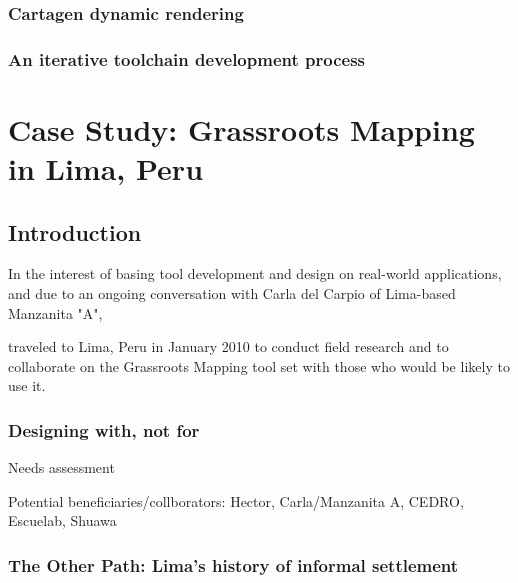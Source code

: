 \documentclass[11pt]{report}
\begin{document}
\subsection{Cartagen dynamic rendering}
\subsection{An iterative toolchain development process}

\chapter{Case Study: Grassroots Mapping in Lima, Peru}

\section{Introduction}

In the interest of basing tool development and design on real-world applications, and due to an ongoing conversation with Carla del Carpio of Lima-based Manzanita "A", 

traveled to Lima, Peru in January 2010 to conduct field research and to collaborate on the Grassroots Mapping tool set with those who would be likely to use it.

\subsection{Designing with, not for}

Needs assessment

Potential beneficiaries/collborators: Hector, Carla/Manzanita A, CEDRO, Escuelab, Shuawa

\subsection{The Other Path: Lima's history of informal settlement}
\end{document}
